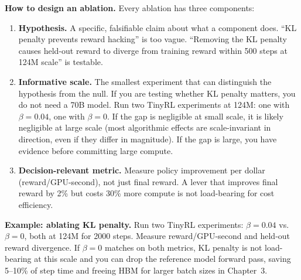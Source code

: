 \textbf{How to design an ablation.} Every ablation has three components:
\begin{enumerate}
  \item \textbf{Hypothesis.} A specific, falsifiable claim about what a component does. ``KL penalty prevents reward hacking'' is too vague. ``Removing the KL penalty causes held-out reward to diverge from training reward within 500 steps at 124M scale'' is testable.
  \item \textbf{Informative scale.} The smallest experiment that can distinguish the hypothesis from the null. If you are testing whether KL penalty matters, you do not need a 70B model. Run two TinyRL experiments at 124M: one with $\beta = 0.04$, one with $\beta = 0$. If the gap is negligible at small scale, it is likely negligible at large scale (most algorithmic effects are scale-invariant in direction, even if they differ in magnitude). If the gap is large, you have evidence before committing large compute.
  \item \textbf{Decision-relevant metric.} Measure policy improvement per dollar (reward/GPU-second), not just final reward. A lever that improves final reward by 2\% but costs 30\% more compute is not load-bearing for cost efficiency.
\end{enumerate}

\textbf{Example: ablating KL penalty.} Run two TinyRL experiments: $\beta = 0.04$ vs.\ $\beta = 0$, both at 124M for 2000 steps. Measure reward/GPU-second and held-out reward divergence. If $\beta = 0$ matches on both metrics, KL penalty is not load-bearing at this scale and you can drop the reference model forward pass, saving 5--10\% of step time and freeing HBM for larger batch sizes in Chapter~3.

